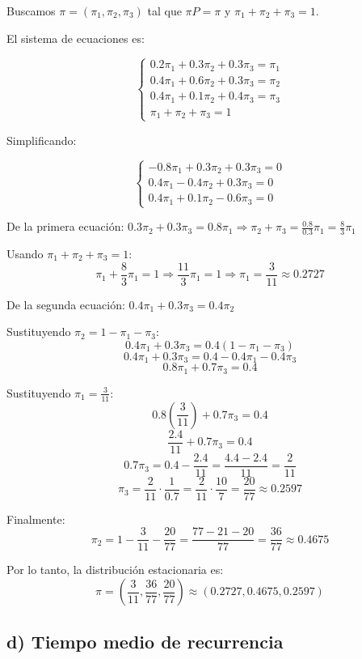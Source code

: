 \documentclass{article}
\begin{document}
Buscamos \(\pi = (\pi_1, \pi_2, \pi_3)\) tal que \(\pi P = \pi\) y \(\pi_1 + \pi_2 + \pi_3 = 1\).

El sistema de ecuaciones es:

\[
\begin{cases}
0.2\pi_1 + 0.3\pi_2 + 0.3\pi_3 = \pi_1 \\
0.4\pi_1 + 0.6\pi_2 + 0.3\pi_3 = \pi_2 \\
0.4\pi_1 + 0.1\pi_2 + 0.4\pi_3 = \pi_3 \\
\pi_1 + \pi_2 + \pi_3 = 1
\end{cases}
\]

Simplificando:

\[
\begin{cases}
-0.8\pi_1 + 0.3\pi_2 + 0.3\pi_3 = 0 \\
0.4\pi_1 - 0.4\pi_2 + 0.3\pi_3 = 0 \\
0.4\pi_1 + 0.1\pi_2 - 0.6\pi_3 = 0
\end{cases}
\]

De la primera ecuación: \(0.3\pi_2 + 0.3\pi_3 = 0.8\pi_1 \Rightarrow \pi_2 + \pi_3 = \frac{0.8}{0.3}\pi_1 = \frac{8}{3}\pi_1\)

Usando \(\pi_1 + \pi_2 + \pi_3 = 1\):
\[
\pi_1 + \frac{8}{3}\pi_1 = 1 \Rightarrow \frac{11}{3}\pi_1 = 1 \Rightarrow \pi_1 = \frac{3}{11} \approx 0.2727
\]

De la segunda ecuación: \(0.4\pi_1 + 0.3\pi_3 = 0.4\pi_2\)

Sustituyendo \(\pi_2 = 1 - \pi_1 - \pi_3\):
\[
0.4\pi_1 + 0.3\pi_3 = 0.4(1 - \pi_1 - \pi_3)
\]
\[
0.4\pi_1 + 0.3\pi_3 = 0.4 - 0.4\pi_1 - 0.4\pi_3
\]
\[
0.8\pi_1 + 0.7\pi_3 = 0.4
\]

Sustituyendo \(\pi_1 = \frac{3}{11}\):
\[
0.8\left(\frac{3}{11}\right) + 0.7\pi_3 = 0.4
\]
\[
\frac{2.4}{11} + 0.7\pi_3 = 0.4
\]
\[
0.7\pi_3 = 0.4 - \frac{2.4}{11} = \frac{4.4 - 2.4}{11} = \frac{2}{11}
\]
\[
\pi_3 = \frac{2}{11} \cdot \frac{1}{0.7} = \frac{2}{11} \cdot \frac{10}{7} = \frac{20}{77} \approx 0.2597
\]

Finalmente:
\[
\pi_2 = 1 - \frac{3}{11} - \frac{20}{77} = \frac{77 - 21 - 20}{77} = \frac{36}{77} \approx 0.4675
\]

Por lo tanto, la distribución estacionaria es:
\[
\pi = \left(\frac{3}{11}, \frac{36}{77}, \frac{20}{77}\right) \approx (0.2727, 0.4675, 0.2597)
\]

\subsection*{d) Tiempo medio de recurrencia}
\end{document}
